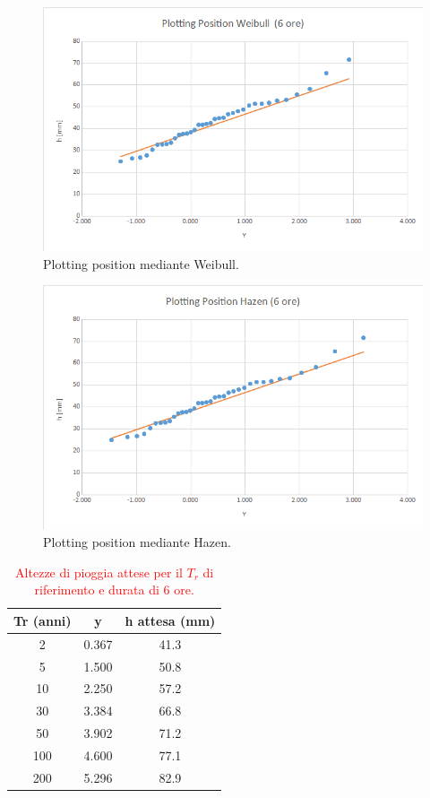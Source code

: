 \begin{figure}[H]\centering
        \includegraphics[scale=.5]{immagini/plot_pos_weib_6ore.png}
        \caption{Plotting position mediante Weibull.}
      \label{plot_pos_weib_6ore}
 \end{figure}

\begin{figure}[H]\centering
        \includegraphics[scale=.5]{immagini/plot_pos_hazen_6ore.png}
        \caption{Plotting position mediante Hazen.}
      \label{plot_pos_hazen_6ore}
\end{figure}

\begin{table}[H] \centering
    \caption{\textcolor{red}{Altezze di pioggia attese per il $T_r$ di riferimento e durata di 6 ore.}}
        \begin{tabular}{ccc}
        \toprule
        Tr (anni) & y     & h attesa (mm) \\
        \midrule
        2 & 0.367 & 41.3  \\
        5 & 1.500 & 50.8  \\
        10  & 2.250 & 57.2          \\
        30  & 3.384 & 66.8          \\
        50  & 3.902 & 71.2          \\
        100 & 4.600 & 77.1          \\
        200 & 5.296 & 82.9          \\         
        \bottomrule
        \end{tabular}
\end{table}

